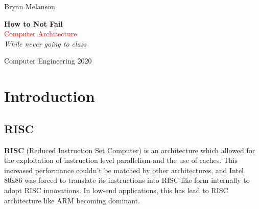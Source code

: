 \documentclass[11pt]{article}
\newcommand*{\plogo}{\fbox{$\mathcal{BM}$}}
\begin{document}
 
        
    \begin{titlepage}
    
        \raggedleft
        
        \vspace*{\baselineskip}
        
        {\Large Bryan Melanson}
        
        \vspace*{0.167\textheight}
        
        \textbf{\LARGE How to Not Fail}\\[\baselineskip]
        
        {\textcolor{Red}{\Huge Computer Architecture}}\\[\baselineskip]
        
        {\Large \textit{While never going to class}}
        
        \vfill
        
        {\large Computer Engineering 2020 ~~\plogo}
        
        \vspace*{3\baselineskip}
    
    \end{titlepage}

    \pagebreak
    
    
    \tableofcontents


\section{Introduction}

\subsection{RISC}

\textbf{RISC} (Reduced Instruction Set Computer) is an architecture which allowed for the exploitation of instruction level parallelism and the use of caches. This increased performance couldn't be matched by other architectures, and Intel 80x86 was forced to translate its instructions into RISC-like form internally to adopt RISC innovations. In low-end applications, this has lead to RISC architecture like ARM becoming dominant.
\end{document}

